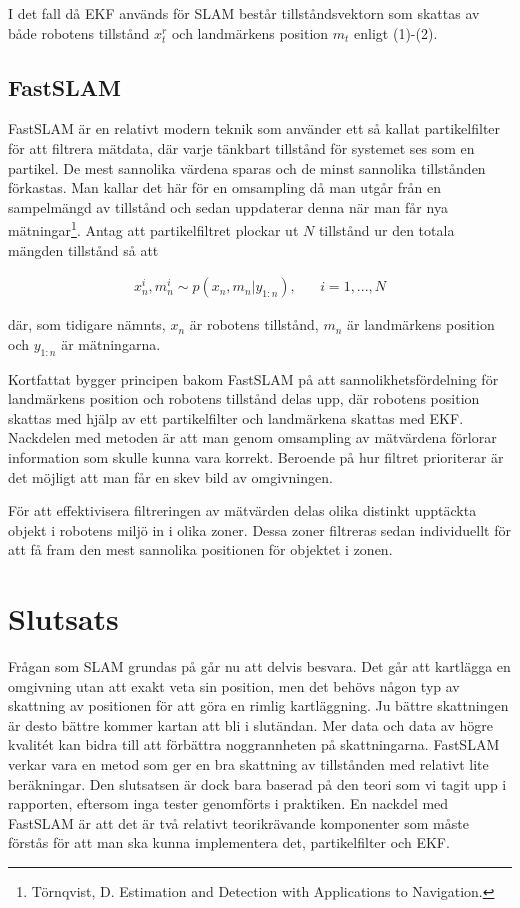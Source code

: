 \documentclass[a4paper,12pt,fleqn]{article}
\begin{document}
I det fall då EKF används för SLAM består tillståndsvektorn som skattas av både robotens tillstånd $x^r_t$ och landmärkens position $m_t$ enligt (1)-(2).

\newpage

\subsection{FastSLAM}
FastSLAM är en relativt modern teknik som använder ett så kallat partikelfilter för att filtrera mätdata, där varje tänkbart tillstånd för systemet ses som en partikel. De mest sannolika värdena sparas och de minst sannolika tillstånden förkastas. Man kallar det här för en omsampling då man utgår från en sampelmängd av tillstånd och sedan uppdaterar denna när man får nya mätningar\footnote{Törnqvist, D. Estimation and Detection with Applications to Navigation.}. Antag att partikelfiltret plockar ut $N$ tillstånd ur den totala mängden tillstånd så att 

\begin{gather}
x^i_n,m^i_n \sim p(x_n,m_n|y_{1:n}),\;\;\;\;\;\; i = 1, ..., N
\end{gather}

där, som tidigare nämnts, $x_n$ är robotens tillstånd, $m_n$ är landmärkens position och $y_{1:n}$ är mätningarna.  

Kortfattat bygger principen bakom FastSLAM på att sannolikhetsfördelning för landmärkens position och robotens tillstånd delas upp, där robotens position skattas med hjälp av ett partikelfilter och landmärkena skattas med EKF. Nackdelen med metoden är att man genom omsampling av mätvärdena förlorar information som skulle kunna vara korrekt. Beroende på hur filtret prioriterar är det möjligt att man får en skev bild av omgivningen. 

För att effektivisera filtreringen av mätvärden delas olika distinkt upptäckta objekt i robotens miljö in i olika zoner. Dessa zoner filtreras sedan individuellt för att få fram den mest sannolika positionen för objektet i zonen.

\newpage
\section{Slutsats}

Frågan som SLAM grundas på går nu att delvis besvara. Det går att kartlägga en omgivning utan att exakt veta sin position, men det behövs någon typ av skattning av positionen för att göra en rimlig kartläggning. Ju bättre skattningen är desto bättre kommer kartan att bli i slutändan. Mer data och data av högre kvalitét kan bidra till att förbättra noggrannheten på skattningarna. FastSLAM verkar vara en metod som ger en bra skattning av tillstånden med relativt lite beräkningar. Den slutsatsen är dock bara baserad på den teori som vi tagit upp i rapporten, eftersom inga tester genomförts i praktiken. En nackdel med FastSLAM är att det är två relativt teorikrävande komponenter som måste förstås för att man ska kunna implementera det, partikelfilter och EKF.
\end{document}
